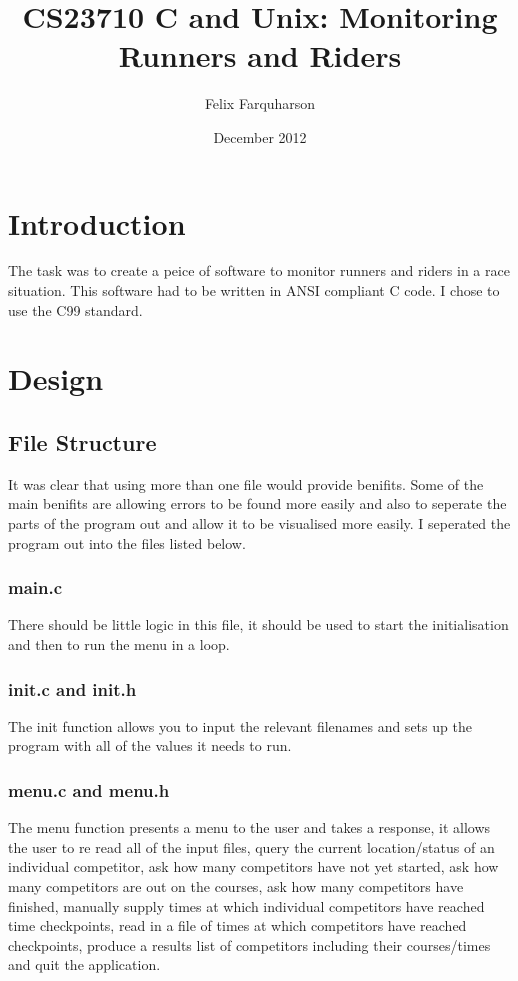 \documentclass{article}
\title{CS23710 C and Unix: Monitoring Runners and Riders}
\author{Felix Farquharson}
\date{December 2012}
\begin{document}
\maketitle
\tableofcontents

\section{Introduction}
The task was to create a peice of software to monitor runners and riders in a race situation. This software had to be written in ANSI compliant C code. I chose to use the C99 standard.

\section{Design}

\subsection{File Structure}
It was clear that using more than one file would provide benifits. Some of the main benifits are allowing errors to be found more easily and also to seperate the parts of the program out and allow it to be visualised more easily. I seperated the program out into the files listed below.

\subsubsection{main.c}
There should be little logic in this file, it should be used to start the initialisation and then to run the menu in a loop.

\subsubsection{init.c and init.h}
The init function allows you to input the relevant filenames and sets up the program with all of the values it needs to run.

\subsubsection{menu.c and menu.h}
The menu function presents a menu to the user and takes a response, it allows the user to re read all of the input files, query the current location/status of an individual competitor, ask how many competitors have not yet started, ask how many competitors are out on the courses, ask how many competitors have finished, manually supply times at which individual competitors have reached time checkpoints, read in a file of times at which competitors have reached checkpoints, produce a results list of competitors including their courses/times and quit the application.
\end{document}
